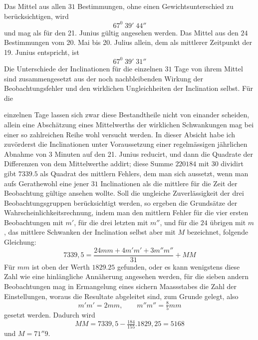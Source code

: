 Das Mittel aus allen $31$ Bestimmungen, ohne einen Gewichtsunterschied zu berücksichtigen, wird
\[
67^0\;39'\;44''
\]
und mag als für den 21. Junius gültig angesehen werden. Das Mittel aus den $24$ Bestimmungen vom 20. Mai bis 20. Julius allein, dem als mittlerer Zeitpunkt der 19. Junius entspricht, ist
\[
67^0\;39'\;31''
\]
Die Unterschiede der Inclinationen für die einzelnen $31$ Tage von ihrem Mittel sind zusammengesetzt aus der noch nachbleibenden Wirkung der Beobachtungsfehler und den wirklichen Ungleichheiten der Inclination selbst. Für die
\par\clearpage
{}
\noindent einzelnen Tage lassen sich zwar diese Bestandtheile nicht von einander scheiden, allein eine Abschätzung eines Mittelwerths der wirklichen Schwankungen mag bei einer so zahlreichen Reihe wohl versucht werden. In dieser Absicht habe ich zuvörderst die Inclinationen unter Voraussetzung einer regelmässigen jährlichen Abnahme von $3$ Minuten auf den 21. Junius reducirt, und dann die Quadrate der Differenzen von dem Mittelwerthe addirt; diese Summe $220184$ mit $30$ dividirt gibt $7339.5$ als Quadrat des mittlern Fehlers, dem man sich aussetzt, wenn man aufs Gerathewohl eine jener $31$ Inclinationen als die mittlere für die Zeit der Beobachtung gültige ansehen wollte. Soll die ungleiche Zuverlässigkeit der drei Beobachtungsgruppen berücksichtigt werden, so ergeben die Grundsätze der Wahrscheinlichkeitsrechnung, indem man den mittlern Fehler für die vier ersten Beobachtungen mit $m'$, für die drei letzten mit $m''$, und für die $24$ übrigen mit $m$, das mittlere Schwanken der Inclination selbst aber mit $M$ bezeichnet, folgende Gleichung:
\[
7339{,}5=\frac{24mm+4m'm'+3m''m''}{31}+MM
\]
Für $mm$ ist oben der Werth $1829.25$ gefunden, oder es kann wenigstens diese Zahl wie eine hinlängliche Annäherung angesehen werden, für die sieben andern Beobachtungen mag in Ermangelung eines sichern Maassstabes die Zahl der Einstellungen, woraus die Resultate abgeleitet sind, zum Grunde gelegt, also
\[
m'm'=2mm,\qquad m''m''=\tfrac85mm
\]
gesetzt werden. Dadurch wird
\[
MM=7339{,}5-\tfrac{184}{155}.1829{,}25=5168
\]
und $M=71''9$.

